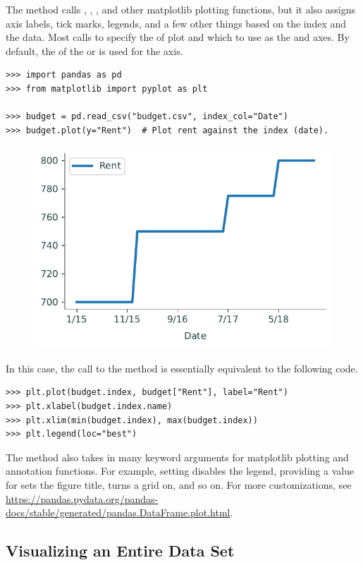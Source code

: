 The  method calls , , , and other matplotlib plotting functions, but it also assigns axis labels, tick marks, legends, and a few other things based on the index and the data.
Most calls to  specify the  of plot and which  to use as the  and  axes.
By default, the  of the  or  is used for the  axis.

\begin{lstlisting}
>>> import pandas as pd
>>> from matplotlib import pyplot as plt

>>> budget = pd.read_csv("budget.csv", index_col="Date")
>>> budget.plot(y="Rent")  # Plot rent against the index (date).
\end{lstlisting}

\begin{figure}[H]
\centering
\includegraphics[width=.7\textwidth]{figures/Rent.pdf}
\end{figure}

In this case, the call to the  method is essentially equivalent to the following code.

\begin{lstlisting}
>>> plt.plot(budget.index, budget["Rent"], label="Rent")
>>> plt.xlabel(budget.index.name)
>>> plt.xlim(min(budget.index), max(budget.index))
>>> plt.legend(loc="best")
\end{lstlisting}

The  method also takes in many keyword arguments for matplotlib plotting and annotation functions.
For example, setting  disables the legend, providing a value for  sets the figure title,  turns a grid on, and so on.
For more customizations, see \url{https://pandas.pydata.org/pandas-docs/stable/generated/pandas.DataFrame.plot.html}.

\subsection*{Visualizing an Entire Data Set} %

